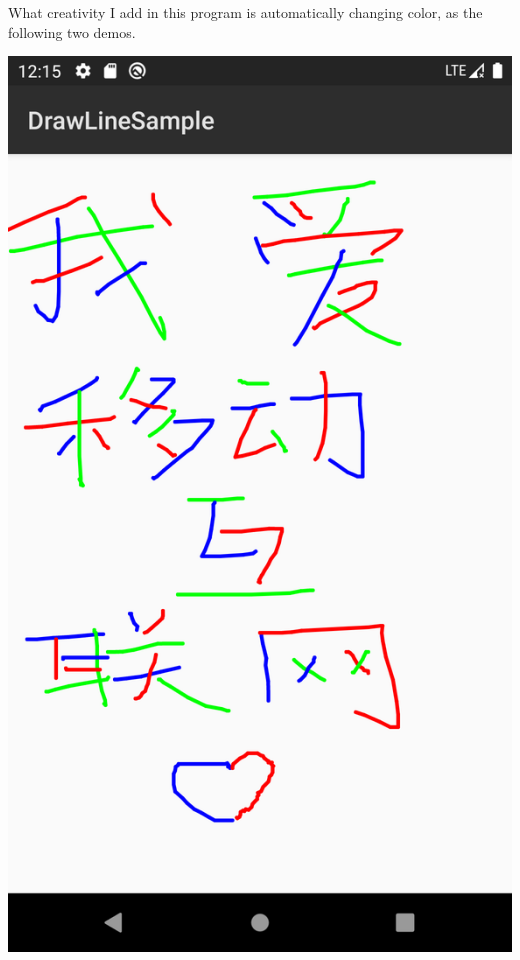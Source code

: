 \documentclass{article}
\begin{document}
	What creativity I add in this program is automatically changing color, as the following two demos.
	
	\begin{center}
		\includegraphics[scale=0.17]{love.png}

\end{center}
\end{document}
